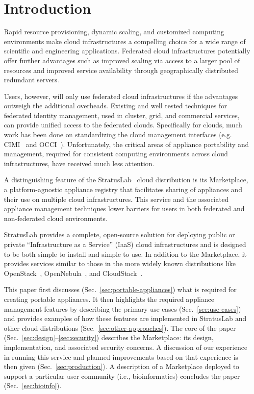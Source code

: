 \section{Introduction}
\label{sec:Introduction}

Rapid resource provisioning, dynamic scaling, and customized computing
environments make cloud infrastructures a compelling choice for a wide
range of scientific and engineering applications.  Federated cloud
infrastructures potentially offer further advantages such as improved
scaling via access to a larger pool of resources and improved service
availability through geographically distributed redundant servers.

Users, however, will only use federated cloud infrastructures if the
advantages outweigh the additional overheads.  Existing and well
tested techniques for federated identity management, used in cluster,
grid, and commercial services, can provide unified access to the
federated clouds.  Specifically for clouds, much work has been done on
standardizing the cloud management interfaces (e.g. CIMI~\cite{cimi}
and OCCI~\cite{occi}).  Unfortunately, the critical areas of appliance
portability and management, required for consistent computing
environments across cloud infrastructures, have received much less
attention.

A distinguishing feature of the StratusLab~\cite{slbook} cloud
distribution is its Marketplace, a platform-agnostic appliance
registry that facilitates sharing of appliances and their use on
multiple cloud infrastructures.  This service and the associated
appliance management techniques lower barriers for users in both
federated and non-federated cloud environments.

StratusLab provides a complete, open-source solution for deploying
public or private ``Infrastructure as a Service'' (IaaS) cloud
infrastructures and is designed to be both simple to install and
simple to use.  In addition to the Marketplace, it provides services
similar to those in the more widely known distributions like
OpenStack~\cite{openstack}, OpenNebula~\cite{one}, and
CloudStack~\cite{cloudstack}.

This paper first discusses (Sec.~\ref{sec:portable-appliances}) what
is required for creating portable appliances. It then highlights the
required appliance management features by describing the primary use
cases (Sec.~\ref{sec:use-cases}) and provides examples of how these
features are implemented in StratusLab and other cloud distributions
(Sec.~\ref{sec:other-approaches}).  The core of the paper
(Sec.~\ref{sec:design}--\ref{sec:security}) describes the Marketplace:
its design, implementation, and associated security concerns.  A
discussion of our experience in running this service and planned
improvements based on that experience is then given
(Sec.~\ref{sec:production}). A description of a Marketplace deployed
to support a particular user community (i.e., bioinformatics)
concludes the paper (Sec.~\ref{sec:bioinfo}).

\pubidadjcol
